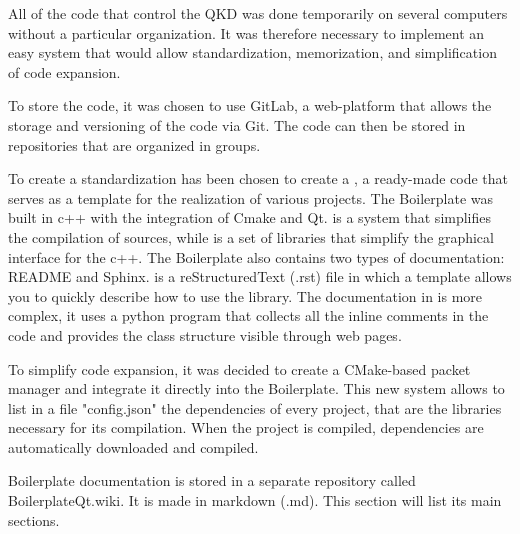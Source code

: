 All of the code that control the QKD was done temporarily on several computers without a particular organization. It was therefore necessary to implement an easy system that would allow standardization, memorization, and simplification of code expansion.

To store the code, it was chosen to use GitLab, a web-platform that allows the storage and versioning of the code via Git. The code can then be stored in repositories that are organized in groups.

To create a standardization has been chosen to create a , a ready-made code that serves as a template for the realization of various projects. The Boilerplate was built in c++ with the integration of Cmake and Qt.
 is a system that simplifies the compilation of sources, while  is a set of libraries that simplify the graphical interface for the c++. The Boilerplate also contains two types of documentation: README and Sphinx.
 is a reStructuredText (.rst) file in which a template allows you to quickly describe how to use the library.
The documentation in  is more complex, it uses a python program that collects all the inline comments in the code and provides the class structure visible through web pages.

To simplify code expansion, it was decided to create a CMake-based packet manager and integrate it directly into the Boilerplate. This new system allows to list in a file "config.json" the dependencies of every project, that are the libraries necessary for its compilation.
When the project is compiled, dependencies are automatically downloaded and compiled.

Boilerplate documentation is stored in a separate repository called BoilerplateQt.wiki. It is made in markdown (.md). This section will list its main sections.






